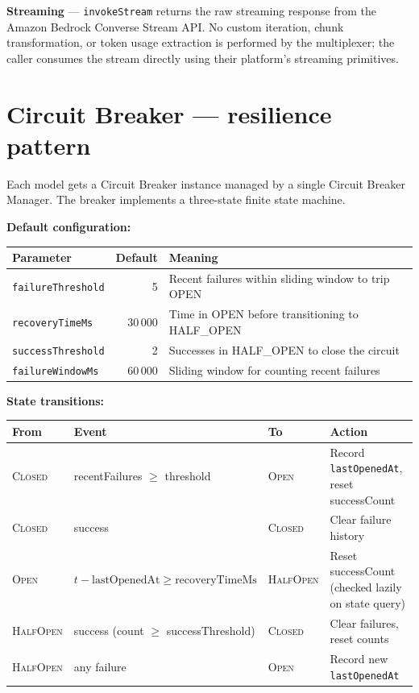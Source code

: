\documentclass[10pt,letterpaper]{article}
\newcommand{\op}[1]{\textsc{#1}}
\newcommand{\fn}[1]{\texttt{#1}}
\newcommand{\fld}[1]{\texttt{#1}}
\begin{document}
\medskip
\noindent\textbf{Streaming} --- \fn{invokeStream} returns the raw streaming response from the Amazon Bedrock Converse Stream API. No custom iteration, chunk transformation, or token usage extraction is performed by the multiplexer; the caller consumes the stream directly using their platform's streaming primitives.

\section*{{\color{errorred}Circuit Breaker} \normalfont\small--- resilience pattern}

Each model gets a Circuit Breaker instance managed by a single Circuit Breaker Manager. The breaker implements a three-state finite state machine.

\medskip
\noindent\textbf{Default configuration:}
\begin{tabular}{@{}l r l@{}}
\toprule
\textbf{Parameter} & \textbf{Default} & \textbf{Meaning} \\
\midrule
\fld{failureThreshold} & 5 & Recent failures within sliding window to trip OPEN \\
\fld{recoveryTimeMs} & 30\,000 & Time in OPEN before transitioning to HALF\_OPEN \\
\fld{successThreshold} & 2 & Successes in HALF\_OPEN to close the circuit \\
\fld{failureWindowMs} & 60\,000 & Sliding window for counting recent failures \\
\bottomrule
\end{tabular}

\medskip
\noindent\textbf{State transitions:}

\smallskip
\begin{tabular}{@{}l l l l@{}}
\toprule
\textbf{From} & \textbf{Event} & \textbf{To} & \textbf{Action} \\
\midrule
\op{Closed} & recentFailures $\ge$ threshold & \op{Open} & Record \fld{lastOpenedAt}, reset successCount \\
\op{Closed} & success & \op{Closed} & Clear failure history \\
\op{Open} & $t - \text{lastOpenedAt} \ge \text{recoveryTimeMs}$ & \op{HalfOpen} & Reset successCount (checked lazily on state query) \\
\op{HalfOpen} & success (count $\ge$ successThreshold) & \op{Closed} & Clear failures, reset counts \\
\op{HalfOpen} & any failure & \op{Open} & Record new \fld{lastOpenedAt} \\
\bottomrule
\end{tabular}
\end{document}
